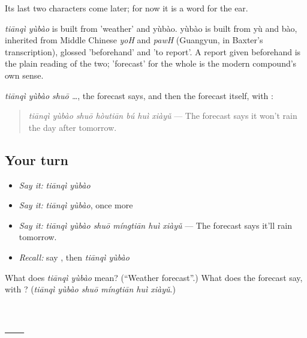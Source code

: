 Its last two characters come later; for now it is a word for the ear.

\begin{cousinweb}
\emph{tiānqì yùbào} is built from  'weather' and yùbào. yùbào is built from yù and bào, inherited from Middle Chinese \emph{yoH} and \emph{pawH} (Guangyun, in Baxter's transcription), glossed 'beforehand' and 'to report'. A report given beforehand is the plain reading of the two; 'forecast' for the whole is the modern compound's own sense.
\end{cousinweb}

\begin{grammarlens}[title={What you've built}]
\emph{tiānqì yùbào shuō …}, the forecast says, and then the forecast itself, with :

\begin{quote}
\emph{tiānqì yùbào shuō hòutiān bú huì xiàyǔ} — The forecast says it won't rain the day after tomorrow.
\end{quote}
\end{grammarlens}

\subsection*{Your turn}
\begin{itemize}
\raggedright
  \item \emph{Say it:} \emph{tiānqì yùbào}
  \item \emph{Say it:} \emph{tiānqì yùbào}, once more
  \item \emph{Say it:} \emph{tiānqì yùbào shuō míngtiān huì xiàyǔ} — The forecast says it'll rain tomorrow.
  \item \emph{Recall:} say , then \emph{tiānqì yùbào}
\end{itemize}

\begin{tcolorbox}[breakable,colback=teal!4,colframe=teal!35!black,title={Before you move on}]
What does \emph{tiānqì yùbào} mean? (\textquotedblleft{}Weather forecast\textquotedblright{}.) What does the forecast say, with ? (\emph{tiānqì yùbào shuō míngtiān huì xiàyǔ}.)
\end{tcolorbox}
\section[Practice]{ — }

\label{lesson:ZH-C147-practice}



